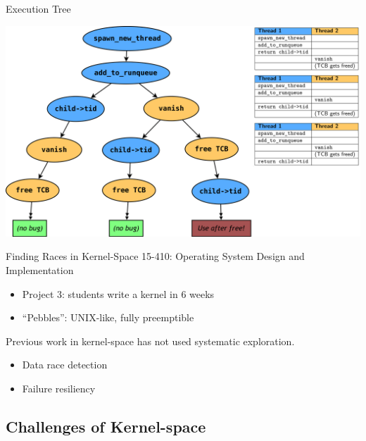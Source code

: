 \documentclass[xcolor=dvipsnames]{beamer}
\begin{document}
\begin{frame}{Execution Tree} %
	\begin{center}
		\includegraphics[width=\textwidth]{tree.png}
	\end{center}
\end{frame}

\begin{frame}{Finding Races in Kernel-Space} %
	15-410: Operating System Design and Implementation
	\begin{itemize}
		\item Project 3: students write a kernel in 6 weeks
		\item ``Pebbles'': UNIX-like, fully preemptible
	\end{itemize}
	\linegap

	Previous work in kernel-space has not used systematic exploration.
	\begin{itemize}
		\item Data race detection
		\item Failure resiliency
	\end{itemize}
\end{frame}

\subsection{Challenges of Kernel-space}

\end{document}

